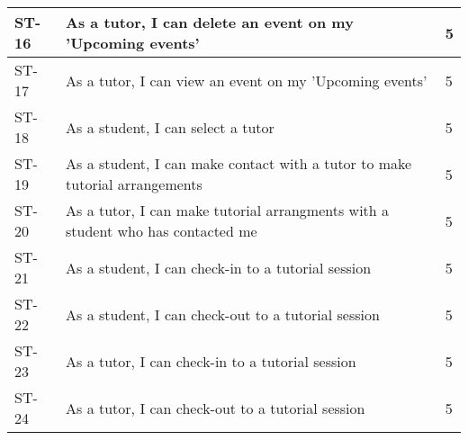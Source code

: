\documentclass[12pt]{article}
\begin{document}
{\begin{longtable}{| l | p{10cm}| l |}
			\\ \hline ST-16 & As a tutor, I can  delete an event on my 'Upcoming events'  & 5 
			
			\\ \hline ST-17 & As a tutor, I can  view an event on my 'Upcoming events'  & 5 

			\\ \hline ST-18 & As a student, I can  select a tutor  & 5 
			
			\\ \hline ST-19 & As a student, I can  make contact with a tutor to make tutorial arrangements  & 5 
			
			\\ \hline ST-20 & As a tutor, I can  make tutorial arrangments with a student who has contacted me  & 5

			\\ \hline ST-21 & As a student, I can  check-in to a tutorial session  & 5 
			
			\\ \hline ST-22 & As a student, I can  check-out to a tutorial session  & 5 
			
			\\ \hline ST-23 & As a tutor, I can  check-in to a tutorial session  & 5 
			
			\\ \hline ST-24 & As a tutor, I can  check-out to a tutorial session  & 5 \\ \hline
\end{longtable}
}
\end{document}
